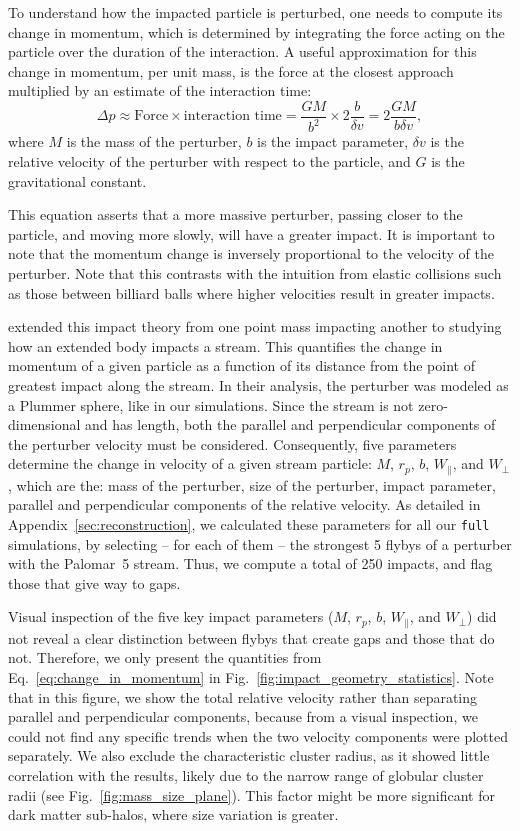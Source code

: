 \documentclass{aa}
\begin{document}
    To understand how the impacted particle is perturbed, one needs to compute its change in momentum, which is determined by integrating the force acting on the particle over the duration of the interaction. A useful approximation for this change in momentum, per unit mass, is the force at the closest approach multiplied by an estimate of the interaction time:
    \begin{equation} \label{eq:change_in_momentum} \Delta p \approx \text{Force} \times \text{interaction time} = \frac{GM}{b^2} \times 2\frac{b}{\delta v} = 2\frac{GM}{b \delta v}, \end{equation}where $M$ is the mass of the perturber, $b$ is the impact parameter, $\delta v$ is the relative velocity of the perturber with respect to the particle, and $G$ is the gravitational constant. 


    This equation asserts that a more massive perturber, passing closer to the particle, and moving more slowly, will have a greater impact. It is important to note that the momentum change is inversely proportional to the velocity of the perturber. Note that this contrasts with the intuition from elastic collisions such as those between billiard balls where higher velocities result in greater impacts.

    \citet{2015MNRAS.450.1136E} extended this impact theory from one point mass impacting another to studying how an extended body impacts a stream. This quantifies the change in momentum of a given particle as a function of its distance from the point of greatest impact along the stream. In their analysis, the perturber was modeled as a Plummer sphere, like in our simulations. Since the stream is not zero-dimensional and has length, both the parallel and perpendicular components of the perturber velocity must be considered. Consequently, five parameters determine the change in velocity of a given stream particle: $M$, $r_p$, $b$, $W_\parallel$, and $W_\perp$, which are the: mass of the perturber, size of the perturber, impact parameter, parallel and perpendicular components of the relative velocity. As detailed in Appendix~\ref{sec:reconstruction}, we calculated these parameters for all our \texttt{full} simulations, by selecting -- for each of them --  the strongest 5 flybys of a perturber with the Palomar~5 stream. Thus, we compute a total of  250 impacts, and flag those that give way to gaps. 


    Visual inspection of the five key impact parameters ($M$, $r_p$, $b$, $W_\parallel$, and $W_\perp$) did not reveal a clear distinction between flybys that create gaps and those that do not. Therefore, we only present the quantities from Eq.~\ref{eq:change_in_momentum} in Fig.~\ref{fig:impact_geometry_statistics}. 
    Note that in this figure, we show the total relative velocity rather than separating parallel and perpendicular components, because from a visual inspection, we could not find any specific trends when the two velocity components were plotted separately. We also exclude the characteristic cluster radius, as it showed little correlation with the results, likely due to the narrow range of globular cluster radii (see Fig.~\ref{fig:mass_size_plane}). This factor might be more significant for dark matter sub-halos, where size variation is greater.
      
\end{document}
